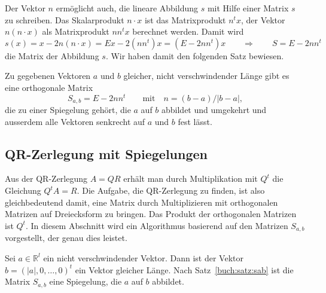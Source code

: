 Der Vektor $n$ ermöglicht auch, die lineare Abbildung $s$ mit Hilfe
einer Matrix $s$ zu schreiben.
Das Skalarprodukt $n\cdot x$ ist das Matrixprodukt $n^t x$, der Vektor
$n(n\cdot x)$ als Matrixprodukt $nn^tx$ berechnet werden. 
Damit wird 
\[
s(x)
=
x - 2n(n\cdot x)
=
Ex - 2(nn^t) x
=
(E-2nn^t) x
\qquad\Rightarrow\qquad
S=E-2nn^t
\]
die Matrix der Abbildung $s$.
Wir haben damit den folgenden Satz bewiesen.

\begin{satz}
\label{buch:satz:sab}
Zu gegebenen Vektoren $a$ und $b$ gleicher, nicht verschwindender
Länge gibt es eine orthogonale Matrix
\[
S_{a,b} = E-2nn^t\qquad \text{mit}\quad n = (b-a)/|b-a|,
\]
die zu einer Spiegelung gehört, die $a$ auf $b$ abbildet und
umgekehrt  und ausserdem alle Vektoren senkrecht auf $a$ und $b$ fest lässt.
\end{satz}

%
%
\subsection{QR-Zerlegung mit Spiegelungen
\label{buch:subsection:qrspiegelungen}}
Aus der QR-Zerlegung $A=QR$ erhält man durch Multiplikation mit $Q^t$
die Gleichung $Q^tA=R$.
Die Aufgabe, die QR-Zerlegung zu finden, ist also gleichbedeutend damit,
eine Matrix durch Multiplizieren mit orthogonalen Matrizen auf Dreiecksform
zu bringen.
Das Produkt der orthogonalen Matrizen ist $Q^t$.
In diesem Abschnitt wird ein Algorithmus basierend auf den Matrizen
$S_{a,b}$ vorgestellt, der genau dies leistet.

Sei $a\in\mathbb R^l$ ein nicht verschwindender Vektor.
Dann ist der Vektor $b=(|a|,0,\dots,0)^t$ ein Vektor gleicher Länge.
Nach Satz~\ref{buch:satz:sab} ist die Matrix $S_{a,b}$ eine Spiegelung,
die $a$ auf $b$ abbildet.

